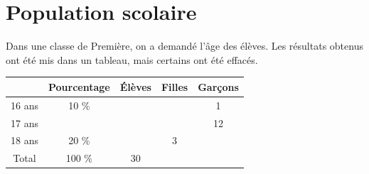 \documentclass[a4paper,11pt]{exam}
\begin{document}
\section{Population scolaire}

Dans une classe de Première, on a demandé l'âge des élèves. Les résultats obtenus ont été mis dans un tableau, mais certains ont été effacés.

\begin{center}
	\begin{tabular}{@{\ }c@{\ }|@{\ }c@{\ }|@{\ }c@{\ }|@{\ }c@{\ }|@{\ }c@{\ }|}
		\cline{2-5}
		& Pourcentage & \'Elèves & Filles & Garçons \\ \hline
		\multicolumn{1}{|c|}{16 ans} & \num{10} \% &  &   & \num{1}  \\ \hline
		\multicolumn{1}{|c|}{17 ans} &                                  &                               &                             & 12                           \\ \hline
		\multicolumn{1}{|c|}{18 ans} & \num{20} \%   &   & 3 &   \\ \hline
		\multicolumn{1}{|c|}{Total}  & \num{100} \% & \num{30}  &   & \\ \hline
	\end{tabular}	
\end{center}
\end{document}
